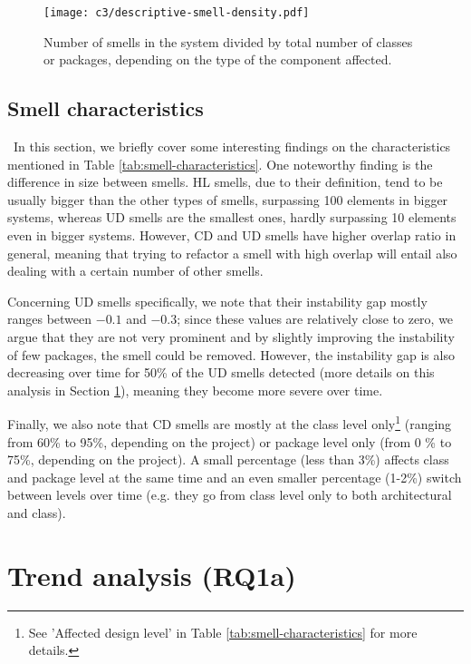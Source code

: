 \begin{figure*}
    \centering
    \texttt{[image: c3/descriptive-smell-density.pdf]}
    \caption{Number of smells in the system divided by total number of classes or packages, depending on the type of the component affected.}\label{c3:fig:smell-count}
\end{figure*}

\subsection{Smell characteristics}\
In this section, we briefly cover some interesting findings on the characteristics mentioned in Table \ref{tab:smell-characteristics}.
One noteworthy finding is the difference in size between smells. HL smells, due to their definition, tend to be usually bigger than the other types of smells, surpassing 100 elements in bigger systems, whereas UD smells are the smallest ones, hardly surpassing 10 elements even in bigger systems.
However, CD and UD smells have higher overlap ratio in general, meaning that trying to refactor a smell with high overlap will entail also dealing with a certain number of other smells.

Concerning UD smells specifically, we note that their instability gap mostly ranges between $-0.1$ and $-0.3$; since these values are relatively close to zero, we argue that they are not very prominent and by slightly improving the instability of few packages, the smell could be removed.
However, the instability gap is also decreasing over time for 50\% of the UD smells detected (more details on this analysis in Section \ref{c3:sec:rq1a-results}), meaning they become more severe over time. 

Finally, we also note that CD smells are mostly at the class level only\footnote{See 'Affected design level' in Table \ref{tab:smell-characteristics} for more details.} (ranging from 60\% to 95\%, depending on the project) or package level only (from 0 \% to 75\%, depending on the project).
A small percentage (less than 3\%) affects class and package level at the same time and an even smaller percentage (1-2\%) switch between levels over time (e.g. they go from class level only to both architectural and class).

\section{Trend analysis (RQ1a)}\label{c3:sec:rq1a-results}
